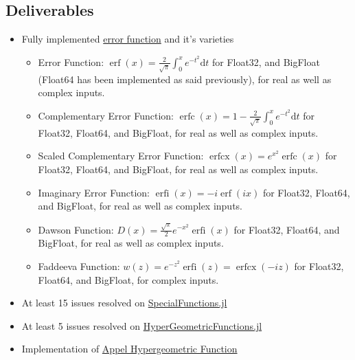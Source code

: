 \documentclass{article}
\theoremstyle{mytheoremstyle}
\theoremstyle{mytheoremstyle}
\theoremstyle{myproblemstyle}
\begin{document}
    \subsection*{Deliverables}
      \begin{itemize}
        \item Fully implemented \href{https://github.com/JuliaMath/SpecialFunctions.jl/blob/master/src/erf.jl}{error function} and it's varieties 
          \begin{itemize}
            \item Error Function: $\operatorname{erf } (x)=\frac{2 }{\sqrt{\pi } }\int_{0}^{x} e ^{-t^2}\text{d}t$ for Float32, and BigFloat (Float64 has been implemented as said previously), for real as well as complex inputs.
            \item Complementary Error Function: $\operatorname{erfc } (x)=1- \frac{2 }{\sqrt{\pi } }\int_{0}^{x} e ^{-t^2}\text{d}t$ for Float32, Float64, and BigFloat, for real as well as complex inputs.
            \item Scaled Complementary Error Function: $\operatorname{erfcx } (x)=e ^{x^2 } \operatorname{erfc} (x)$ for Float32, Float64, and BigFloat, for real as well as complex inputs.
            \item Imaginary Error Function: $\operatorname{erfi } (x)= -i \operatorname{erf} (ix)$ for Float32, Float64, and BigFloat, for real as well as complex inputs.
            \item Dawson Function: $D (x)=\frac{\sqrt{\pi } }{2 }e ^{-x^2 } \operatorname{erfi} (x)$ for Float32, Float64, and BigFloat, for real as well as complex inputs.
            \item Faddeeva Function: $w (z)=e ^{-z^2 } \operatorname{erfi} (z)= \operatorname{erfcx}(-iz)$ for Float32, Float64, and BigFloat, for complex inputs.
          \end{itemize}
        \item At least 15 issues resolved on \href{https://github.com/JuliaMath/SpecialFunctions.jl/issues}{SpecialFunctions.jl} 
        \item At least 5 issues resolved on \href{https://github.com/JuliaMath/HypergeometricFunctions.jl/issues}{HyperGeometricFunctions.jl} 
        \item Implementation of \href{https://en.wikipedia.org/wiki/Appell_series}{Appel Hypergeometric Function} 
      \end{itemize}
\end{document}
